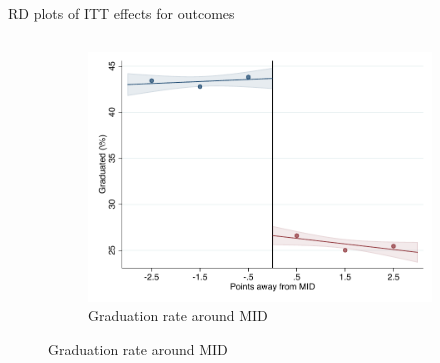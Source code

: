 \documentclass[notes,11pt, aspectratio=169]{beamer}
\begin{document}
\begin{frame}[label=ITT_rd_plot_IPN,fragile]{RD plots of ITT effects for outcomes}
{\begin{figure}
\begin{columns}[T]
\begin{column}{.5\textwidth}
    {\begin{subfigure}{\textwidth}
        \centering
        \caption{Graduation rate around MID}
        \includegraphics[width=\textwidth]{04_Figures/rd_plot_mid_ENLACE_ANY_IPN3.pdf}
    \end{subfigure}}
\end{column}
\end{columns}

\label{fig:ITT_rd_plot_IPN}    
\end{figure}}

\end{frame}
\end{document}
